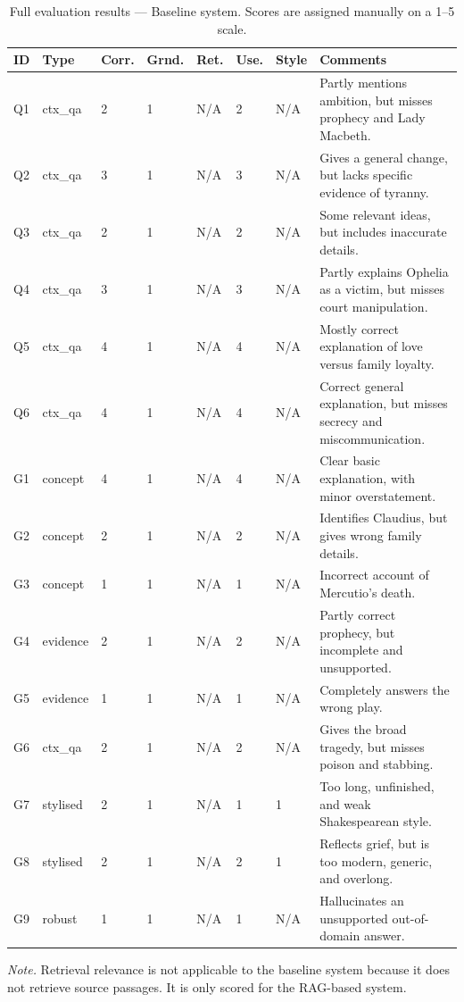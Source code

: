 \documentclass[10pt,conference]{IEEEtran}
\begin{document}
\begin{table}[t]
\centering
\caption{Full evaluation results --- Baseline system. Scores are assigned manually on a 1--5 scale.}
\label{tab:full-eval-baseline}
\small
\begin{tabularx}{\textwidth}{llp{0.9cm}p{0.9cm}p{0.9cm}p{0.9cm}p{0.9cm}X}
\toprule
ID & Type & Corr. & Grnd. & Ret. & Use. & Style & Comments \\
\midrule
Q1 & ctx\_qa & 2 & 1 & N/A & 2 & N/A & Partly mentions ambition, but misses prophecy and Lady Macbeth. \\
Q2 & ctx\_qa & 3 & 1 & N/A & 3 & N/A & Gives a general change, but lacks specific evidence of tyranny. \\
Q3 & ctx\_qa & 2 & 1 & N/A & 2 & N/A & Some relevant ideas, but includes inaccurate details. \\
Q4 & ctx\_qa & 3 & 1 & N/A & 3 & N/A & Partly explains Ophelia as a victim, but misses court manipulation. \\
Q5 & ctx\_qa & 4 & 1 & N/A & 4 & N/A & Mostly correct explanation of love versus family loyalty. \\
Q6 & ctx\_qa & 4 & 1 & N/A & 4 & N/A & Correct general explanation, but misses secrecy and miscommunication. \\
G1 & concept & 4 & 1 & N/A & 4 & N/A & Clear basic explanation, with minor overstatement. \\
G2 & concept & 2 & 1 & N/A & 2 & N/A & Identifies Claudius, but gives wrong family details. \\
G3 & concept & 1 & 1 & N/A & 1 & N/A & Incorrect account of Mercutio's death. \\
G4 & evidence & 2 & 1 & N/A & 2 & N/A & Partly correct prophecy, but incomplete and unsupported. \\
G5 & evidence & 1 & 1 & N/A & 1 & N/A & Completely answers the wrong play. \\
G6 & ctx\_qa & 2 & 1 & N/A & 2 & N/A & Gives the broad tragedy, but misses poison and stabbing. \\
G7 & stylised & 2 & 1 & N/A & 1 & 1 & Too long, unfinished, and weak Shakespearean style. \\
G8 & stylised & 2 & 1 & N/A & 2 & 1 & Reflects grief, but is too modern, generic, and overlong. \\
G9 & robust & 1 & 1 & N/A & 1 & N/A & Hallucinates an unsupported out-of-domain answer. \\
\bottomrule
\end{tabularx}

\vspace{0.5em}
\begin{minipage}{0.96\textwidth}
\footnotesize
\textit{Note.} Retrieval relevance is not applicable to the baseline system because it does not retrieve source passages. It is only scored for the RAG-based system.
\end{minipage}
\end{table}
\end{document}
